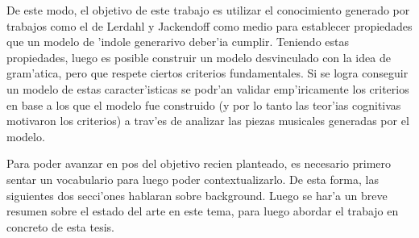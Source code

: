De este modo, el objetivo de este trabajo es utilizar el conocimiento generado por trabajos como el de Lerdahl y Jackendoff como medio para establecer propiedades que un modelo de 
'indole generarivo deber'ia cumplir. Teniendo estas propiedades, luego es posible construir un modelo desvinculado con la idea de gram'atica, pero que respete 
ciertos criterios fundamentales. Si se logra conseguir un modelo de estas caracter'isticas se podr'an validar emp'iricamente los criterios en base a los que el modelo fue construido 
(y por lo tanto las teor'ias cognitivas motivaron los criterios) a trav'es de analizar las piezas musicales generadas por el modelo.

Para poder avanzar en pos del objetivo recien planteado, es necesario primero sentar un vocabulario para luego poder contextualizarlo. De esta forma, las siguientes dos
secci'ones hablaran sobre background. Luego se har'a un breve resumen sobre el estado del arte en este tema, para luego abordar el trabajo en concreto de esta tesis.

